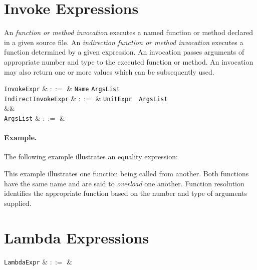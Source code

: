 \section{Invoke Expressions}
\label{c_expr_invoke}
An {\em function or method invocation} executes a named function or method declared in a given source file.  An {\em indirection function or method invocation} executes a function determined by a given expression.  An invocation passes arguments of appropriate number and type to the executed function or method.  An invocation may also return one or more values which can be subsequently used.


\begin{syntax}
  \verb+InvokeExpr+ & $::=$ & \verb+Name+ \token{(} \verb+ArgsList+ \token{)}\\
  \verb+IndirectInvokeExpr+ & $::=$ & \verb+UnitExpr+\ \token{(}\ \verb+ArgsList+\ \token{)}\\
&&\\
\verb+ArgsList+ & $::=$ & \\
\end{syntax}

\paragraph{Example.}

The following example illustrates an equality expression:



This example illustrates one function being called from another.  Both functions have the same name and are said to {\em overload} one another.  Function resolution identifies the appropriate function based on the number and type of arguments supplied.  


\section{Lambda Expressions}
\label{c_expr_lambda}

\begin{syntax}
  \verb+LambdaExpr+ & $::=$ &\\
\end{syntax}

